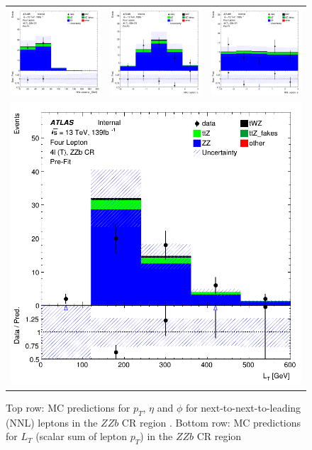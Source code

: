 \begin{figure}[htbp]
    \centering
  \begin{tabular}{ccc}



    \includegraphics[width=.2\textwidth]{figures/PreFitPlots/lep4_ZZb_4T_NNL_lepton_pt} &
    \includegraphics[width=.2\textwidth]{figures/PreFitPlots/lep4_ZZb_4T_NNL_lepton_eta} &
    \includegraphics[width=.2\textwidth]{figures/PreFitPlots/lep4_ZZb_4T_NNL_lepton_phi} \\
    \multicolumn{3}{c}{\includegraphics[width=.2\textwidth]{figures/PreFitPlots/lep4_ZZb_4T_LT} }\\

  \end{tabular}
  \caption{Top row: MC predictions for $p_{T}$, $\eta$ and $\phi$ for next-to-next-to-leading (NNL) leptons in the $ZZb$ CR region . Bottom row: MC predictions for $L_{T}$ (scalar sum of lepton $p_{T}$)  in the $ZZb$ CR region }
  \label{fig:4lep-ZZb-CR-leptonPlots}
\end{figure}

